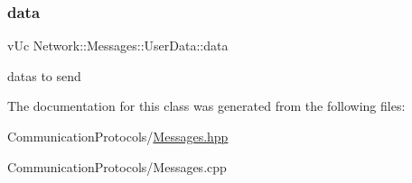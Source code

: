 \subsubsection{\texorpdfstring{data}{data}}
{\footnotesize\ttfamily v\+Uc Network\+::\+Messages\+::\+User\+Data\+::data}

datas to send 

The documentation for this class was generated from the following files\+:\begin{DoxyCompactItemize}
\item 
Communication\+Protocols/\hyperlink{_messages_8hpp}{Messages.\+hpp}\item 
Communication\+Protocols/Messages.\+cpp\end{DoxyCompactItemize}
